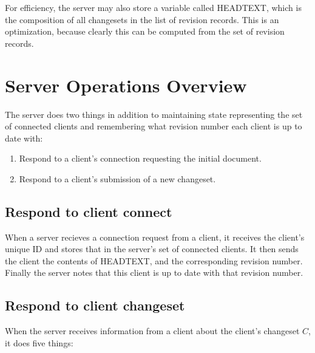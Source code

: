\documentclass{article}
\begin{document}
For efficiency, the server may also store a variable
called HEADTEXT, which is the composition of all
changesets in the list of revision records.  This is an
optimization, because clearly this can be computed from
the set of revision records.

\section{Server Operations Overview}

The server does two things in addition to maintaining
state representing the set of connected clients and
remembering what revision number each client is up to date
with:

\begin{enumerate}
\item Respond to a client's connection requesting the initial document.
\item Respond to a client's submission of a new changeset.
\end{enumerate}

\subsection{Respond to client connect}
When a server recieves a connection request from a client,
it receives the client's unique ID and stores that in the
server's set of connected clients.  It then sends the
client the contents of HEADTEXT, and the corresponding
revision number.  Finally the server notes that this
client is up to date with that revision number.

\subsection{Respond to client changeset}

When the server receives information from a client about
the client's changeset $C$, it does five things:
\end{document}
